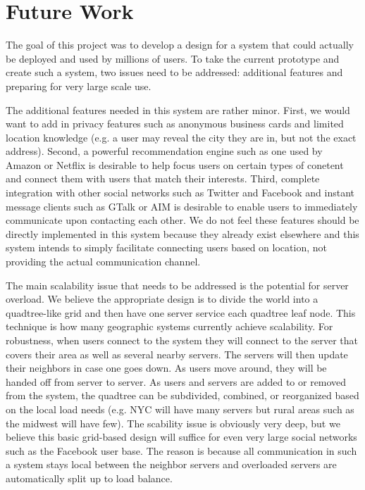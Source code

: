 \documentclass[11pt]{article}
\begin{document}
\section{Future Work}

The goal of this project was to develop a design for a system that could
actually be deployed and used by millions of users. To take the current 
prototype and create such a system, two issues need to be addressed:
additional features and preparing for very large scale use. 

The additional features needed in this system are rather minor. First,
we would want to add in privacy features such as anonymous business cards
and limited location knowledge (e.g. a user may reveal the city they
are in, but not the exact address). Second, a powerful recommendation
engine such as one used by Amazon or Netflix is desirable to help focus
users on certain types of conetent and connect them with users that match
their interests.  Third, complete integration with other social networks
such as Twitter and Facebook and instant message clients such as GTalk
or AIM is desirable to enable users to immediately communicate upon
contacting each other. We do not feel these features should be directly
implemented in this system because they already exist elsewhere and this
system intends to simply facilitate connecting users based on location,
not providing the actual communication channel.

The main scalability issue that needs to be addressed is the potential
for server overload. We believe the appropriate design is to divide
the world into a quadtree-like grid and then have one server service
each quadtree leaf node. This technique is how many geographic systems currently
achieve scalability.  For robustness, when users connect to the system
they will connect to the server that covers their area as well as several
nearby servers. The servers will then update their neighbors in case one
goes down. As users move around, they will be handed off from server to
server. As users and servers are added to or removed from the system, the quadtree
can be subdivided, combined, or reorganized based on the local load needs
(e.g. NYC will have many servers but rural areas such as the midwest will
have few). The scability issue is obviously very deep, but we believe this
basic grid-based design will suffice for even very large social networks
such as the Facebook user base. The reason is because all communication
in such a system stays local between the neighbor servers and overloaded
servers are automatically split up to load balance.
\end{document}
